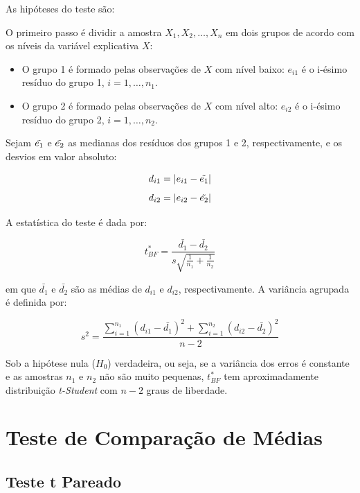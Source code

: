 \documentclass[
]{estat/estat}
\providecommand{\tightlist}{%
  \setlength{\itemsep}{0pt}\setlength{\parskip}{0pt}}\usepackage{longtable,booktabs,array}
\begin{document}
As hipóteses do teste são:


O primeiro passo é dividir a amostra \(X_1, X_2, \ldots, X_n\) em dois
grupos de acordo com os níveis da variável explicativa \(X\):

\begin{itemize}
\tightlist
\item
  O grupo 1 é formado pelas observações de \(X\) com nível baixo:
  \(e_{i1}\) é o i-ésimo resíduo do grupo 1, \(i = 1, \ldots, n_1\).
\item
  O grupo 2 é formado pelas observações de \(X\) com nível alto:
  \(e_{i2}\) é o i-ésimo resíduo do grupo 2, \(i = 1, \ldots, n_2\).
\end{itemize}

Sejam \(\Tilde{e_1}\) e \(\Tilde{e_2}\) as medianas dos resíduos dos
grupos 1 e 2, respectivamente, e os desvios em valor absoluto:

\[ d_{i1} = |e_{i1} - \Tilde{e_1}| \]
\[ d_{i2} = |e_{i2} - \Tilde{e_2}| \]

A estatística do teste é dada por:

\[ t^*_{BF} = \frac{\bar{d_1} - \bar{d_2}}{s\sqrt{\frac{1}{n_1} + \frac{1}{n_2}}} \]

em que \(\bar{d_1}\) e \(\bar{d_2}\) são as médias de \(d_{i1}\) e
\(d_{i2}\), respectivamente. A variância agrupada é definida por:

\[ s^2 = \frac{\displaystyle \sum_{i=1}^{n_1}(d_{i1} - \bar{d_1})^2 + \displaystyle \sum_{i=1}^{n_2}(d_{i2} - \bar{d_2})^2}{n - 2} \]

Sob a hipótese nula (\(H_0\)) verdadeira, ou seja, se a variância dos
erros é constante e as amostras \(n_1\) e \(n_2\) não são muito
pequenas, \(t^*_{BF}\) tem aproximadamente distribuição
\textit{t-Student} com \(n - 2\) graus de liberdade.

\hypertarget{teste-de-comparauxe7uxe3o-de-muxe9dias}{%
\section{Teste de Comparação de
Médias}\label{teste-de-comparauxe7uxe3o-de-muxe9dias}}

\hypertarget{teste-t-pareado}{%
\subsection{Teste t Pareado}\label{teste-t-pareado}}
\end{document}

